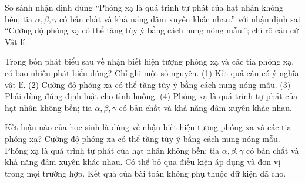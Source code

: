 \begin{bt}
So sánh nhận định đúng “Phóng xạ là quá trình tự phát của hạt nhân không bền; tia $\alpha,\beta,\gamma$ có bản chất và khả năng đâm xuyên khác nhau.” với nhận định sai “Cường độ phóng xạ có thể tăng tùy ý bằng cách nung nóng mẫu.”; chỉ rõ căn cứ Vật lí.
\end{bt}

\begin{ex}
Trong bốn phát biểu sau về nhận biết hiện tượng phóng xạ và các tia phóng xạ, có bao nhiêu phát biểu đúng? Chỉ ghi một số nguyên. (1) Kết quả cần có ý nghĩa vật lí. (2) Cường độ phóng xạ có thể tăng tùy ý bằng cách nung nóng mẫu. (3) Phải dùng đúng định luật cho tình huống. (4) Phóng xạ là quá trình tự phát của hạt nhân không bền; tia $\alpha,\beta,\gamma$ có bản chất và khả năng đâm xuyên khác nhau.
\end{ex}

\begin{ex}
Kết luận nào của học sinh là đúng về nhận biết hiện tượng phóng xạ và các tia phóng xạ?
\choice
{Cường độ phóng xạ có thể tăng tùy ý bằng cách nung nóng mẫu.}
{\True Phóng xạ là quá trình tự phát của hạt nhân không bền; tia $\alpha,\beta,\gamma$ có bản chất và khả năng đâm xuyên khác nhau.}
{Có thể bỏ qua điều kiện áp dụng và đơn vị trong mọi trường hợp.}
{Kết quả của bài toán không phụ thuộc dữ kiện đã cho.}
\end{ex}

